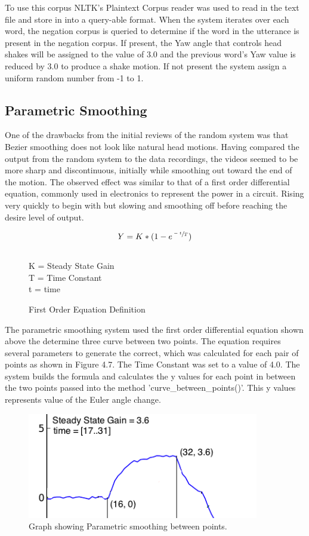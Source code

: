 \documentclass[bsc,frontabs,twoside,singlespacing,parskip]{infthesis}
\begin{document}
To use this corpus NLTK's Plaintext Corpus reader was used to read in the text file and store in into a query-able format. When the system iterates over each word, the negation corpus is queried to determine if the word in the utterance is present in the negation corpus. If present, the Yaw angle that controls head shakes will be assigned to the value of 3.0 and the previous word's Yaw value is reduced by 3.0 to produce a shake motion. If not present the system assign a uniform random number from -1 to 1.

\subsection{Parametric Smoothing}

One of the drawbacks from the initial reviews of the random system was that Bezier smoothing does not look like natural head motions. Having compared the output from the random system to the data recordings, the videos seemed to be more sharp and discontinuous, initially while smoothing out toward the end of the motion. The observed effect was similar to that of a first order differential equation, commonly used in electronics to represent the power in a circuit. Rising very quickly to begin with but slowing and smoothing off before reaching the desire level of output. 

\begin{figure}
	\centering
	$$ Y =  K * (1 - e^{\sfrac{-t}{T}})$$
	\\
	K = Steady State Gain\\
	T = Time Constant\\
	t = time\\
	
	\caption{First Order Equation Definition} 
\end{figure}

The parametric smoothing system used the first order differential equation shown above the determine three curve between two points. The equation requires several parameters to generate the correct, which was calculated for each pair of points as shown in Figure 4.7. The Time Constant was set to a value of 4.0. The system builds the formula and calculates the y values for each point in between the two points passed into the method 'curve\_between\_points()'. This y values represents value of the Euler angle change.

\begin{figure}
	\includegraphics[width=0.9\textwidth]{parametric_ex.png}
	\caption{Graph showing Parametric smoothing between points.}
\end{figure}
\end{document}

